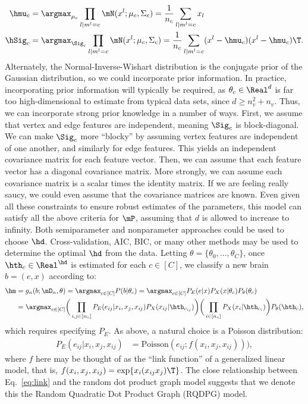 \begin{align}
	\hmu_c &= \argmax_{\mu_c} \prod_{l | m^l= c} \mN(x^l; \mu_c, \Sigma_c) = \frac{1}{n_c} \sum_{l | m^l = c} x_l \\
	\hSig_c &= \argmax_{\Sig_c} \prod_{l | m^l= c} \mN(x^l; \mu_c, \Sigma_c) =\frac{1}{n_c} \sum_{l | m^l=c} (x^l - \hmu_c) (x^l -\hmu_c)\T.
\end{align}
Alternately, the Normal-Inverse-Wishart distribution is the conjugate prior of the Gaussian distribution, so we could incorporate prior information. In practice, incorporating prior information will typically be required, as $\theta_c \in \Real^d$ is far too high-dimensional to estimate from typical data sets, since $d \geq n_v^2+n_v$.  Thus, we can incorporate strong prior knowledge in a number of ways.  First, we assume that vertex and edge features are independent, meaning $\Sig_c$ is block-diagonal.  We can make $\Sig_c$ more ``blocky'' by assuming vertex features are independent of one another, and similarly for edge features.  This yields an independent covariance matrix for each feature vector.  Then, we can assume that each feature vector has a diagonal covariance matrix. More strongly, we can assume each covariance matrix is a scalar times the identity matrix.  If we are feeling really saucy, we could even assume that the covariance matrices are known.  Even given all these constraints to ensure robust estimates of the parameters, this model can satisfy all the above criteria for $\mP$, assuming that $d$ is allowed to increase to infinity.  Both semiparameter and nonparameter approaches could be used to choose $\hd$.  Cross-validation, AIC, BIC, or many other methods may be used to determine the optimal $\hd$ from the data. Letting $\theta=\{\theta_0,\ldots,\theta_C\}$, once $\hth_c \in \Real^{\hd}$ is estimated for each $c\in[C]$, we classify a new brain $b=(e,x)$ according to:
\begin{align}
	 \hm &= g_n(b; \mD_n, \theta) = \argmax_{c\in[C]} P(b | \theta_c) 
	 	 = \argmax_{c\in[C]}  P_E(e | x)  P_X(x | \theta_c) P_{\theta}(\theta_c) \nonumber \\
		&= \argmax_{c\in[C]}  \bigg(\prod_{i,j \in [n_v]} P_E(e_{ij} | x_i, x_j, x_{ij}) P_X(x_{ij} | \hth_{c_{ij}})\bigg) \bigg(\prod_{i \in [n_v]} P_X(x_i | \hth_{c_i})\bigg)  P_{\theta}(\hth_c)
		,
\end{align}
which requires specifying $P_E$. As above, a natural choice is a Poisson distribution:
\begin{align} \label{eq:link}
	P_E(e_{ij} | x_i, x_j, x_{ij}) &= \text{Poisson}(e_{ij}; f(x_i,x_j,x_{ij}))),
\end{align}
where $f$ here may be thought of as the ``link function'' of a generalized linear model, that is, $f(x_i,x_j,x_{ij})=\exp\{x_i (x_{ij} x_j)\T\}$. The close relationship between Eq.~\ref{eq:link}  and the random dot product graph model suggests that we denote this the Random Quadratic Dot Product Graph (RQDPG) model.  


